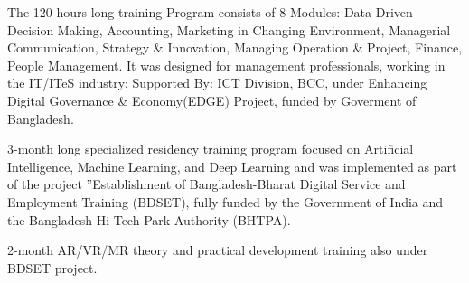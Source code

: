 \documentclass[]{plushcv}
\begin{document}
\begin{minipage}[t]{0.63\textwidth}
\begin{tightemize}
\item The 120 hours long training Program consists of 8 Modules: Data Driven Decision Making, Accounting, Marketing in Changing Environment, Managerial Communication, Strategy \& Innovation, Managing Operation \& Project, Finance, People Management. It was designed for management professionals, working in the IT/ITeS industry; Supported By: ICT Division, BCC, under Enhancing Digital Governance \& Economy(EDGE) Project, funded by Goverment of Bangladesh.
\end{tightemize}
\sectionsep

\vspace{\topsep}
\begin{tightemize}
\item 3-month long specialized residency training program  focused on Artificial Intelligence, Machine Learning, and Deep Learning and was implemented as part of the project ”Establishment of Bangladesh-Bharat Digital Service and Employment Training (BDSET), fully funded by the Government of India and the Bangladesh Hi-Tech Park Authority (BHTPA).
\end{tightemize}
\sectionsep

\vspace{\topsep}
\begin{tightemize}
\item 2-month AR/VR/MR theory and practical development training also under BDSET project.
\end{tightemize}
\sectionsep



%
%

\end{minipage} 
\end{document}
